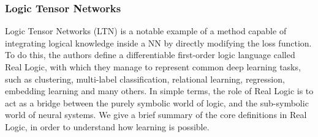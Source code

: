  \subsubsection{Logic Tensor Networks}
 Logic Tensor Networks (LTN) \cite{serafini2016logic} is a notable example of a method capable of integrating logical knowledge inside a NN by directly modifying the loss function. To do this, the authors define a differentiable first-order logic language called Real Logic, with which they manage to represent common deep learning tasks, such as clustering, multi-label classification, relational learning, regression, embedding learning and many others. 
 In simple terms, the role of Real Logic is to act as a bridge between the purely symbolic world of logic, and the sub-symbolic world of neural systems. We give a brief summary of the core definitions in Real Logic, in order to understand how learning is possible.
 
